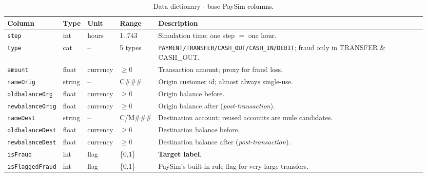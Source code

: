 \documentclass[11pt,a4paper]{report}
\newcommand{\code}[1]{\texttt{\small #1}}
\begin{document}
\begin{table}[h]
\centering
\footnotesize
\begin{tabularx}{\textwidth}{@{}l l l l Y@{}}
\toprule
\textbf{Column} & \textbf{Type} & \textbf{Unit} & \textbf{Range} & \textbf{Description}\\
\midrule
\code{step} & int & hours & 1..743 & Simulation time; one step $=$ one hour.\\
\code{type} & cat & -- & 5 types & \code{PAYMENT/TRANSFER/CASH\_OUT/CASH\_IN/DEBIT}; fraud only in TRANSFER \& CASH\_OUT.\\
\code{amount} & float & currency & $\ge 0$ & Transaction amount; proxy for fraud loss.\\
\code{nameOrig} & string & -- & C\#\#\# & Origin customer id; almost always single-use.\\
\code{oldbalanceOrg} & float & currency & $\ge 0$ & Origin balance before.\\
\code{newbalanceOrig} & float & currency & $\ge 0$ & Origin balance after (\emph{post-transaction}).\\
\code{nameDest} & string & -- & C/M\#\#\# & Destination account; reused accounts are mule candidates.\\
\code{oldbalanceDest} & float & currency & $\ge 0$ & Destination balance before.\\
\code{newbalanceDest} & float & currency & $\ge 0$ & Destination balance after (\emph{post-transaction}).\\
\code{isFraud} & int & flag & \{0,1\} & \textbf{Target label}.\\
\code{isFlaggedFraud} & int & flag & \{0,1\} & PaySim's built-in rule flag for very large transfers.\\
\bottomrule
\end{tabularx}
\caption{Data dictionary - base PaySim columns.}
\label{tab:datadict_base}
\end{table}
\end{document}
